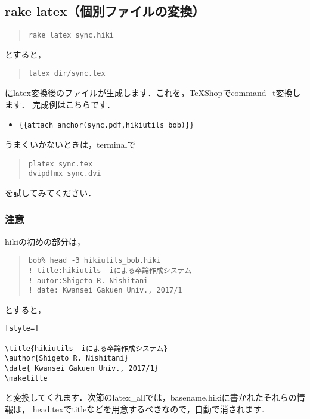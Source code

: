 \subsection{rake latex（個別ファイルの変換）}\begin{quote}\begin{verbatim}
rake latex sync.hiki
\end{verbatim}\end{quote}
とすると，
\begin{quote}\begin{verbatim}
latex_dir/sync.tex
\end{verbatim}\end{quote}
にlatex変換後のファイルが生成します．これを，TeXShopでcommand\_t変換します．
完成例はこちらです．

\begin{itemize}
\item \verb|{{attach_anchor(sync.pdf,hikiutils_bob)}}|
\end{itemize}
うまくいかないときは，terminalで
\begin{quote}\begin{verbatim}
platex sync.tex
dvipdfmx sync.dvi
\end{verbatim}\end{quote}
を試してみてください．

\subsubsection{注意}
hikiの初めの部分は，
\begin{quote}\begin{verbatim}
bob% head -3 hikiutils_bob.hiki
! title:hikiutils -iによる卒論作成システム
! autor:Shigeto R. Nishitani
! date: Kwansei Gakuen Univ., 2017/1

\end{verbatim}\end{quote}
とすると，
\begin{lstlisting}[style=]

\title{hikiutils -iによる卒論作成システム}
\author{Shigeto R. Nishitani}
\date{ Kwansei Gakuen Univ., 2017/1}
\maketitle
\end{lstlisting}
と変換してくれます．次節のlatex\_allでは，basename.hikiに書かれたそれらの情報は，
head.texでtitleなどを用意するべきなので，自動で消されます．


